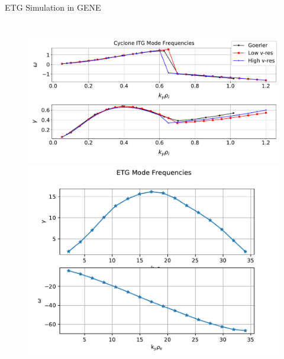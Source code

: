 \documentclass[aspectratio=43]{beamer}
\begin{document}
   \begin{frame}{ETG Simulation in GENE}
      \begin{columns}
         \begin{figure}
            \includegraphics[width=.8\textwidth,height=.3\textheight]{Images/LinearITG_KinEl_GrowthRates.pdf}
            \includegraphics[width=.8\textwidth]{Images/GrowthRates_ETG.pdf}
         \end{figure}
      \end{columns}
   \end{frame}
\end{document}
